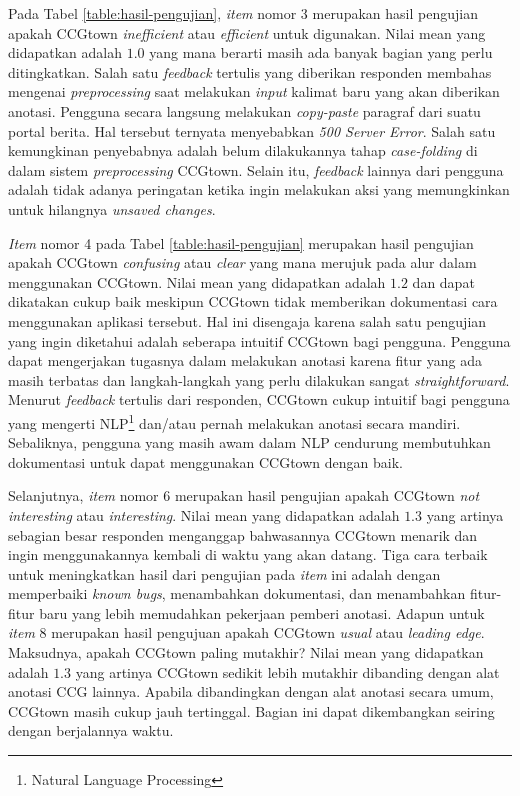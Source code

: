 Pada Tabel \ref{table:hasil-pengujian}, \textit{item} nomor 3 merupakan hasil pengujian apakah
CCGtown \textit{inefficient} atau \textit{efficient} untuk digunakan. Nilai mean yang didapatkan
adalah $1.0$ yang mana berarti masih ada banyak bagian yang perlu ditingkatkan. Salah satu
\textit{feedback} tertulis yang diberikan responden membahas mengenai \textit{preprocessing}
saat melakukan \textit{input} kalimat baru yang akan diberikan anotasi. Pengguna secara langsung
melakukan \textit{copy-paste} paragraf dari suatu portal berita. Hal tersebut ternyata menyebabkan
\textit{500 Server Error}. Salah satu kemungkinan penyebabnya adalah belum dilakukannya tahap
\textit{case-folding} di dalam sistem \textit{preprocessing} CCGtown. Selain itu, \textit{feedback}
lainnya dari pengguna adalah tidak adanya peringatan ketika ingin melakukan aksi yang memungkinkan
untuk hilangnya \textit{unsaved changes}.

\textit{Item} nomor 4 pada Tabel \ref{table:hasil-pengujian} merupakan hasil pengujian apakah
CCGtown \textit{confusing} atau \textit{clear} yang mana merujuk pada alur dalam menggunakan
CCGtown. Nilai mean yang didapatkan adalah $1.2$ dan dapat dikatakan cukup baik meskipun CCGtown
tidak memberikan dokumentasi cara menggunakan aplikasi tersebut. Hal ini disengaja karena salah satu
pengujian yang ingin diketahui adalah seberapa intuitif CCGtown bagi pengguna. Pengguna dapat
mengerjakan tugasnya dalam melakukan anotasi karena fitur yang ada masih terbatas dan
langkah-langkah yang perlu dilakukan sangat \textit{straightforward}. Menurut \textit{feedback}
tertulis dari responden, CCGtown cukup intuitif bagi pengguna yang mengerti
NLP\footnote{Natural Language Processing} dan/atau pernah melakukan anotasi secara mandiri.
Sebaliknya, pengguna yang masih awam dalam NLP cendurung membutuhkan dokumentasi untuk dapat
menggunakan CCGtown dengan baik.

Selanjutnya, \textit{item} nomor 6 merupakan hasil pengujian apakah CCGtown \textit{not interesting}
atau \textit{interesting}. Nilai mean yang didapatkan adalah $1.3$ yang artinya sebagian besar
responden menganggap bahwasannya CCGtown menarik dan ingin menggunakannya kembali di waktu yang
akan datang. Tiga cara terbaik untuk meningkatkan hasil dari pengujian pada \textit{item} ini adalah
dengan memperbaiki \textit{known bugs}, menambahkan dokumentasi, dan menambahkan fitur-fitur baru
yang lebih memudahkan pekerjaan pemberi anotasi. Adapun untuk \textit{item} 8 merupakan hasil
pengujuan apakah CCGtown \textit{usual} atau \textit{leading edge}. Maksudnya, apakah CCGtown
paling mutakhir? Nilai mean yang didapatkan adalah $1.3$ yang artinya CCGtown sedikit lebih
mutakhir dibanding dengan alat anotasi CCG lainnya. Apabila dibandingkan dengan alat anotasi
secara umum, CCGtown masih cukup jauh tertinggal. Bagian ini dapat dikembangkan seiring dengan
berjalannya waktu.


